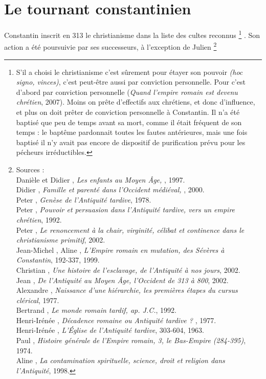 

\chapter{Le tournant constantinien}


 Constantin inscrit en 313 le christianisme dans la liste des cultes reconnus%
\footnote{S'il a choisi le christianisme c'est sûrement pour étayer son pouvoir \emph{(hoc signo, vinces)}, c'est peut-être aussi par conviction personnelle. Pour  c'est d'abord par conviction personnelle (\emph{Quand l'empire romain est devenu chrétien}, 2007). Moins on prête d'effectifs aux chrétiens, et donc d'influence, et plus on doit prêter de conviction personnelle à Constantin. Il n'a été baptisé que peu de temps avant sa mort, comme il était fréquent de son temps : le baptême pardonnait toutes les fautes antérieures, mais une fois baptisé il n'y avait pas encore de dispositif de purification prévu pour les pécheurs irréductibles. }%
. Son action a été poursuivie par ses successeurs, à l'exception de Julien%
\footnote{Sources :
\\Danièle  et Didier , \emph{Les enfants au Moyen Âge, }, 1997.
\\Didier {}, \emph{Famille et parenté dans l'Occident médiéval, }, 2000.
\\Peter {}, \emph{Genèse de l'Antiquité tardive}, 1978.
\\Peter {}, \emph{Pouvoir et persuasion dans l'Antiquité tardive, vers un empire chrétien}, 1992.
\\Peter {}, \emph{Le renoncement à la chair, virginité, célibat et continence dans le christianisme primitif}, 2002.
\\Jean-Michel , Aline , \emph{L'Empire romain en mutation, des Sévères à Constantin}, 192-337, 1999.
\\Christian {}, \emph{Une histoire de l'esclavage, de l'Antiquité à nos jours}, 2002.
\\Jean {}, \emph{De l'Antiquité au Moyen Âge, l'Occident de 313 à 800}, 2002.
\\Alexandre {}, \emph{Naissance d'une hiérarchie, les premières étapes du cursus clérical}, 1977.
\\Bertrand {}, \emph{Le monde romain tardif,  ap. J.C.}, 1992.
\\Henri-Irénée , \emph{Décadence romaine ou Antiquité tardive ? }, 1977.
\\Henri-Irénée , \emph{L'Église de l'Antiquité tardive}, 303-604, 1963.
\\Paul {}, \emph{Histoire générale de l'Empire romain, 3, le Bas-Empire (284-395)}, 1974.
\\Aline {}, \emph{La contamination spirituelle, science, droit et religion dans l'Antiquité}, 1998.}%
